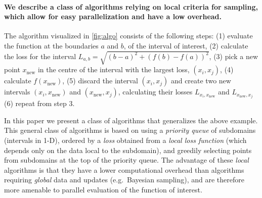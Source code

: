\documentclass[english, twocolumn, 10pt, aps, superscriptaddress, floatfix, prb, citeautoscript]{revtex4-1}
\begin{document}
\paragraph{We describe a class of algorithms relying on local criteria for sampling, which allow for easy parallelization and have a low overhead.}

The algorithm visualized in \ref{fig:algo} consists of the following steps:
(1) evaluate the function at the boundaries \(a\) and \(b\), of the interval of interest,
(2) calculate the loss for the interval \(L_{a, b} = \sqrt{(b - a)^2 + (f(b) - f(a))^2}\),
(3) pick a new point \(x_\textrm{new}\) in the centre of the interval with the largest loss, \((x_i, x_j)\),
(4) calculate \(f(x_\textrm{new})\),
(5) discard the interval \((x_i, x_j)\) and create two new intervals \((x_i, x_\textrm{new})\) and \((x_\textrm{new}, x_j)\), calculating their losses \(L_{x_i, x_\textrm{new}}\) and \(L_{x_\textrm{new}, x_j}\)
(6) repeat from step 3.

In this paper we present a class of algorithms that generalizes the above example.
This general class of algorithms is based on using a \emph{priority queue} of subdomains (intervals in 1-D), ordered by a \emph{loss} obtained from a \emph{local loss function} (which depends only on the data local to the subdomain), and greedily selecting points from subdomains at the top of the priority queue.
The advantage of these \emph{local} algorithms is that they have a lower computational overhead than algorithms requiring \emph{global} data and updates (e.g.~Bayesian sampling), and are therefore more amenable to parallel evaluation of the function of interest.
\end{document}
